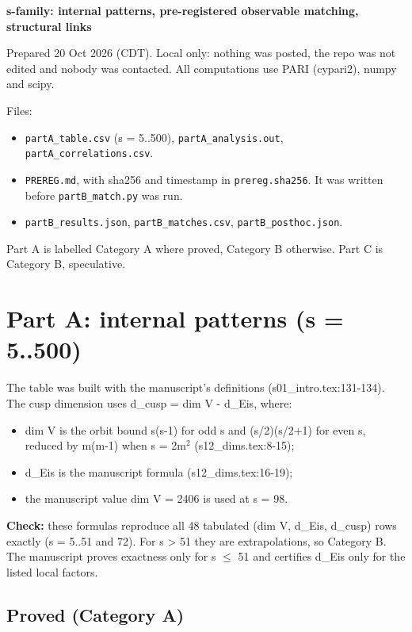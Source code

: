 \documentclass[10pt]{article}\usepackage[margin=0.8in]{geometry}\usepackage{amssymb,longtable,array,url,hyperref}\usepackage[T1]{fontenc}\usepackage{lmodern}\sloppy\usepackage{newunicodechar}\newunicodechar{η}{\ensuremath{\eta}}\newunicodechar{ω}{\ensuremath{\omega}}\newunicodechar{⁺}{\ensuremath{^{+}}}\newunicodechar{⁻}{\ensuremath{^{-}}}\newunicodechar{∏}{\ensuremath{\prod}}\newunicodechar{⁸}{\ensuremath{^{8}}}\newunicodechar{⁴}{\ensuremath{^{4}}}\newunicodechar{⁶}{\ensuremath{^{6}}}\newunicodechar{θ}{\ensuremath{\theta}}\newunicodechar{₇}{\ensuremath{_{7}}}\newunicodechar{₂}{\ensuremath{_{2}}}\newunicodechar{₁}{\ensuremath{_{1}}}\newunicodechar{⊕}{\ensuremath{\oplus}}
\begin{document}
\begin{center}{\Large\bfseries s-family: internal patterns, pre-registered observable matching, structural links}\end{center}

Prepared 20 Oct 2026 (CDT). Local only: nothing was posted, the repo was not edited and nobody was contacted. All computations use PARI (cypari2), numpy and scipy.

Files:
\begin{itemize}
\item  \texttt{partA\_table.csv} (s = 5..500), \texttt{partA\_analysis.out}, \texttt{partA\_correlations.csv}.
\item  \texttt{PREREG.md}, with sha256 and timestamp in \texttt{prereg.sha256}. It was written before \texttt{partB\_match.py} was run.
\item  \texttt{partB\_results.json}, \texttt{partB\_matches.csv}, \texttt{partB\_posthoc.json}.
\end{itemize}

Part A is labelled Category A where proved, Category B otherwise. Part C is Category B, speculative.

\section*{Part A: internal patterns (s = 5..500)}

The table was built with the manuscript's definitions (s01\_intro.tex:131-134). The cusp dimension uses d\_cusp = dim V - d\_Eis, where:
\begin{itemize}
\item  dim V is the orbit bound s(s-1) for odd s and (s/2)(s/2+1) for even s, reduced by m(m-1) when s = 2m$^2$ (s12\_dims.tex:8-15);
\item  d\_Eis is the manuscript formula (s12\_dims.tex:16-19);
\item  the manuscript value dim V = 2406 is used at s = 98.
\end{itemize}

\textbf{Check:} these formulas reproduce all 48 tabulated (dim V, d\_Eis, d\_cusp) rows exactly (s = 5..51 and 72). For s > 51 they are extrapolations, so Category B. The manuscript proves exactness only for s $\leq$ 51 and certifies d\_Eis only for the listed local factors.

\subsection*{Proved (Category A)}
\end{document}
